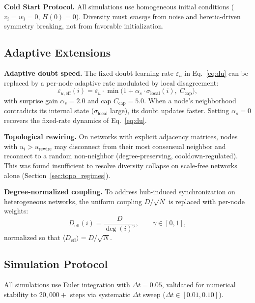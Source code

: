 \documentclass[11pt]{article}
\begin{document}
\textbf{Cold Start Protocol.} All simulations use homogeneous initial conditions ($v_i = w_i = 0$, $H(0) = 0$). Diversity must \emph{emerge} from noise and heretic-driven symmetry breaking, not from favorable initialization.

\subsection{Adaptive Extensions}
\label{sec:adaptive}

\textbf{Adaptive doubt speed.} The fixed doubt learning rate $\varepsilon_u$ in Eq.~\ref{eq:du} can be replaced by a per-node adaptive rate modulated by local disagreement:
\begin{equation}
\varepsilon_{u,\text{eff}}(i) = \varepsilon_u \cdot \min\!\bigl(1 + \alpha_s \cdot \sigma_{\text{local}}(i),\; C_{\text{cap}}\bigr),
\label{eq:meta_doubt}
\end{equation}
with surprise gain $\alpha_s = 2.0$ and cap $C_{\text{cap}} = 5.0$. When a node's neighborhood contradicts its internal state ($\sigma_{\text{local}}$ large), its doubt updates faster. Setting $\alpha_s = 0$ recovers the fixed-rate dynamics of Eq.~\ref{eq:du}.

\textbf{Topological rewiring.} On networks with explicit adjacency matrices, nodes with $u_i > u_{\text{rewire}}$ may disconnect from their most consensual neighbor and reconnect to a random non-neighbor (degree-preserving, cooldown-regulated). This was found insufficient to resolve diversity collapse on scale-free networks alone (Section~\ref{sec:topo_regimes}).

\textbf{Degree-normalized coupling.} To address hub-induced synchronization on heterogeneous networks, the uniform coupling $D/\sqrt{N}$ is replaced with per-node weights:
\begin{equation}
D_{\text{eff}}(i) = \frac{D}{\deg(i)^\gamma}, \qquad \gamma \in [0, 1],
\label{eq:degree_norm}
\end{equation}
normalized so that $\langle D_{\text{eff}} \rangle = D/\sqrt{N}$.

\subsection{Simulation Protocol}

All simulations use Euler integration with $\Delta t = 0.05$, validated for numerical stability to $20{,}000+$ steps via systematic $\Delta t$ sweep ($\Delta t \in [0.01, 0.10]$).
\end{document}
